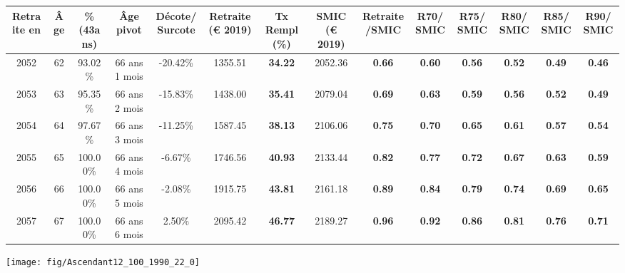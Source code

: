 \begin{adjustbox}{max width=\textwidth} 
\begin{tabular}[htb]{|c|c||c|c|c||c|c||c|c||c|c|c|c|c|} 
\hline 
 Retraite en &  Âge &  \%(43ans) &  Âge pivot &  Décote/Surcote &  Retraite (\euro{} 2019) &  Tx Rempl(\%) &  SMIC (\euro{} 2019) &  Retraite/SMIC &  R70/SMIC &  R75/SMIC &  R80/SMIC &  R85/SMIC &  R90/SMIC \\ 
\hline \hline 
 2052 &  62 &  93.02\% &  66 ans 1 mois &  -20.42\% &  1355.51 &  {\bf 34.22} &  2052.36 &  {\bf {\color{red} 0.66}} &  {\bf {\color{red} 0.60}} &  {\bf {\color{red} 0.56}} &  {\bf {\color{red} 0.52}} &  {\bf {\color{red} 0.49}} &  {\bf {\color{red} 0.46}} \\ 
\hline 
 2053 &  63 &  95.35\% &  66 ans 2 mois &  -15.83\% &  1438.00 &  {\bf 35.41} &  2079.04 &  {\bf {\color{red} 0.69}} &  {\bf {\color{red} 0.63}} &  {\bf {\color{red} 0.59}} &  {\bf {\color{red} 0.56}} &  {\bf {\color{red} 0.52}} &  {\bf {\color{red} 0.49}} \\ 
\hline 
 2054 &  64 &  97.67\% &  66 ans 3 mois &  -11.25\% &  1587.45 &  {\bf 38.13} &  2106.06 &  {\bf {\color{red} 0.75}} &  {\bf {\color{red} 0.70}} &  {\bf {\color{red} 0.65}} &  {\bf {\color{red} 0.61}} &  {\bf {\color{red} 0.57}} &  {\bf {\color{red} 0.54}} \\ 
\hline 
 2055 &  65 &  100.00\% &  66 ans 4 mois &  -6.67\% &  1746.56 &  {\bf 40.93} &  2133.44 &  {\bf {\color{red} 0.82}} &  {\bf {\color{red} 0.77}} &  {\bf {\color{red} 0.72}} &  {\bf {\color{red} 0.67}} &  {\bf {\color{red} 0.63}} &  {\bf {\color{red} 0.59}} \\ 
\hline 
 2056 &  66 &  100.00\% &  66 ans 5 mois &  -2.08\% &  1915.75 &  {\bf 43.81} &  2161.18 &  {\bf {\color{red} 0.89}} &  {\bf {\color{red} 0.84}} &  {\bf {\color{red} 0.79}} &  {\bf {\color{red} 0.74}} &  {\bf {\color{red} 0.69}} &  {\bf {\color{red} 0.65}} \\ 
\hline 
 2057 &  67 &  100.00\% &  66 ans 6 mois &  2.50\% &  2095.42 &  {\bf 46.77} &  2189.27 &  {\bf {\color{red} 0.96}} &  {\bf {\color{red} 0.92}} &  {\bf {\color{red} 0.86}} &  {\bf {\color{red} 0.81}} &  {\bf {\color{red} 0.76}} &  {\bf {\color{red} 0.71}} \\ 
\hline 
\hline 
\end{tabular} 
\end{adjustbox} 
 
 \vspace{0.1cm} 

 {\hspace{-2.2cm}\texttt{[image: fig/Ascendant12\_100\_1990\_22\_0]}} 

